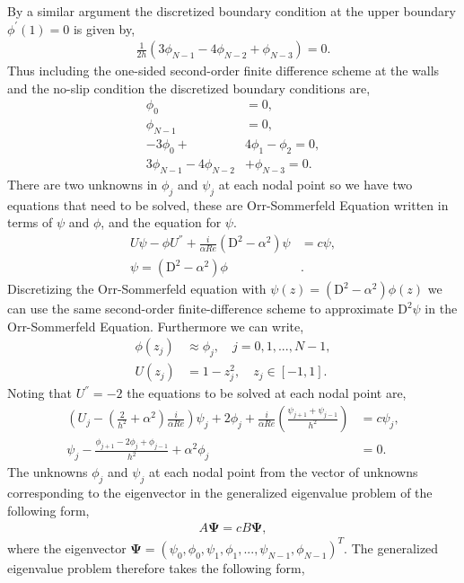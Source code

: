 \documentclass[a4paper, 12pt, twoside, openright]{article}
\numberwithin{equation}{section}
\begin{document}
By a similar argument the discretized boundary condition at the upper boundary $\phi^{\prime}(1) = 0$ is given by,
\begin{align*}
\frac{1}{2h}\left(3\phi_{N-1} - 4\phi_{N-2}+\phi_{N-3} \right) = 0.
\end{align*}
Thus including the one-sided second-order finite difference scheme at the walls and the no-slip condition the discretized boundary conditions are,
\begin{align}
\phi_0 &= 0, \\
\phi_{N-1} &= 0,\\
-3\phi_0 + &4\phi_1-\phi_2 = 0,\\
3\phi_{N-1} - 4\phi_{N-2}& + \phi_{N-3} = 0.
\end{align}
There are two unknowns in $\phi_j$ and $\psi_j$ at each nodal point so we have two equations that need to be solved, these are Orr-Sommerfeld Equation written in terms of $\psi$ and $\phi$, and the equation for $\psi$.
\begin{align}
U\psi - \phi U^{''} + \frac{i}{\alpha Re}\left(\mathrm{D}^2-\alpha^2\right)\psi &= c\psi,\\
\psi = \left(\mathrm{D}^2- \alpha^2\right)\phi&. 
\end{align}
Discretizing the Orr-Sommerfeld equation with $\psi(z) = (\mathrm{D}^2-\alpha^2)\phi(z)$ we can use the same second-order finite-difference scheme to approximate $\mathrm{D}^2 \psi$ in the Orr-Sommerfeld Equation.
Furthermore we can write,
\begin{align*}
\phi(z_j) &\approx\phi_j, \quad j=0,1,...,N-1,\\ 
U(z_j) &= 1-z_j ^2, \quad z_j \in [-1,1]. 
\end{align*}
Noting that $U^{''} = -2 $ the equations to be solved at each nodal point are,
\begin{align}
\left(U_j - \left( \frac{2}{h^2}+\alpha^2 \right)\frac{i}{\alpha Re}\right)\psi_j + 2\phi_j + \frac{i}{\alpha Re} \left( \frac{\psi_{j+1}+\psi_{j-1}}{h^2} \right) &= c\psi_j,\\ 
\psi_j - \frac{\phi_{j+1} - 2\phi_j + \phi_{j-1}}{h^2} + \alpha^2\phi_j &= 0.
\end{align}
The unknowns $\phi_j$ and $\psi_j$ at each nodal point from the vector of unknowns corresponding to the eigenvector in the generalized eigenvalue problem of the following form,
\begin{align}
A\mathbf{\Psi} = cB\mathbf{\Psi},
\end{align}
where the eigenvector $\mathbf{\Psi} = \left(\psi_0, \phi_0,\psi_1,\phi_1,...,\psi_{N-1},\phi_{N-1}\right)^{T}$. The generalized eigenvalue problem therefore takes the following form,  
\end{document}

